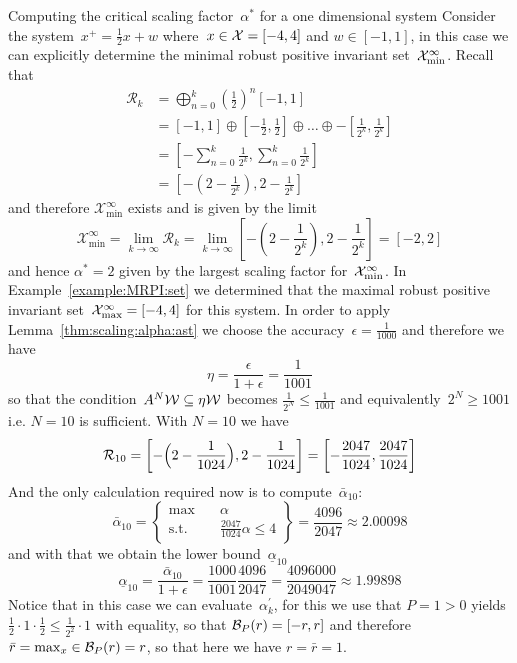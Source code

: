 \begin{example}{Computing the critical scaling factor~$\alpha^\ast$ for a one dimensional system}\label{example:computing:alpha:star}
Consider the system~$x^+ = \frac{1}{2}x+w$ where~$x\in\mathcal X=[-4,4]$ and $w\in[-1,1]$, in this case we can explicitly determine the minimal robust positive invariant set~$\mathcal X^\infty_{\min}$.
%
Recall that 
%
\begin{equation*}\begin{aligned}
	\mathcal R_k &= \bigoplus_{n=0}^k \left(\frac{1}{2}\right)^n[-1,1]\\ 
	&= [-1,1] \oplus [-\frac{1}{2},\frac{1}{2}] \oplus \dots\oplus -[\frac{1}{2^k},\frac{1}{2^k}]\\
	&= [-\sum_{n=0}^k\frac{1}{2^k},\sum_{n=0}^k\frac{1}{2^k}]\\
	&= [-(2-\frac{1}{2^k}),2-\frac{1}{2^k}]
\end{aligned}\end{equation*}
%
and therefore $\mathcal X^\infty_{\min}$ exists and is given by the limit
%
$$
\mathcal X^\infty_{\min}=\lim_{k\rightarrow\infty}\mathcal R_k=\lim_{k\rightarrow\infty}[-(2-\frac{1}{2^k}),2-\frac{1}{2^k}] = [-2,2]
$$
%
and hence $\alpha^\ast=2$ given by the largest scaling factor for~$\mathcal X^\infty_{\min}$.
%
In Example~\ref{example:MRPI:set} we determined that the maximal robust positive invariant set~$\mathcal X^\infty_{\max}=[-4,4]$ for this system.
%
In order to apply Lemma~\ref{thm:scaling:alpha:ast} we choose the accuracy~$\epsilon=\frac{1}{1000}$ and therefore we have 
%
\[
	\eta = \frac{\epsilon}{1+\epsilon} = \frac{1}{1001}
\]
%
so that the condition~$A^N\mathcal W\subseteq\eta\mathcal W$ becomes $\frac{1}{2^N}\leq\frac{1}{1001}$ and equivalently~$2^N\geq1001$ i.e. $N=10$ is sufficient.
%
With $N=10$ we have 
%
\[
\mathcal R_{10} = \left[-\Bigl(2-\frac{1}{1024}\Bigr),2-\frac{1}{1024}\right] = \left[-\frac{2047}{1024},\frac{2047}{1024}\right]
\]
%
And the only calculation required now is to compute~$\bar\alpha_{10}$:
%
\[
	\bar\alpha_{10} = \left\{\begin{aligned}\max&\quad\alpha\\
	\text{s.t.}	&\quad \frac{2047}{1024}\alpha\leq 4
	\end{aligned}\right\}=\frac{4096}{2047} \approx 2.00098
\]
%
and with that we obtain the lower bound~$\underline\alpha_{10}$
%
\[
\underline\alpha_{10} = \frac{\bar\alpha_{10}}{1+\epsilon} = \frac{1000}{1001}\frac{4096}{2047} = \frac{4096000}{2049047}\approx1.99898
\]
%
Notice that in this case we can evaluate~$\alpha_k^\prime$, for this we use that $P=1>0$ yields $\frac{1}{2}\cdot1\cdot\frac{1}{2}\leq\frac{1}{2^2}\cdot1$ with equality, so that $\mathcal B_P(r)=[-r,r]$ and therefore~$\bar r = \max_x\in\mathcal B_P(r)=r$, so that here we have $r=\bar r=1$.

\end{example}
